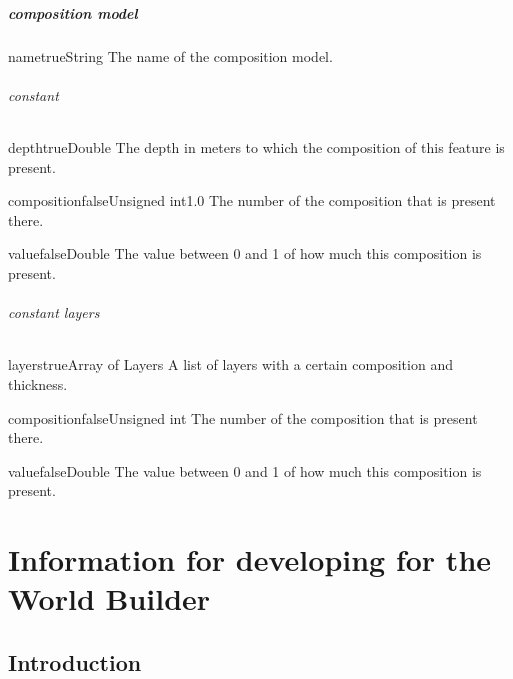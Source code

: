 \documentclass{book}
\begin{document}
\subsubsection{composition model}
\begin{parameterbox}{name}{true}{String}{}
The name of the composition model.
\end{parameterbox}

\paragraph{constant}
\begin{parameterbox}{depth}{true}{Double}{}
The depth in meters to which the composition of this feature is present.
\end{parameterbox}

\begin{parameterbox}{composition}{false}{Unsigned int}{1.0}
The number of the composition that is present there.
\end{parameterbox}

\begin{parameterbox}{value}{false}{Double}{}
The value between 0 and 1 of how much this composition is present.
\end{parameterbox}

\paragraph{constant layers}
\begin{parameterbox}{layers}{true}{Array of Layers}{}
A list of layers with a certain composition and thickness.
\end{parameterbox}

\begin{parameterbox}{composition}{false}{Unsigned int}{}
The number of the composition that is present there.
\end{parameterbox}

\begin{parameterbox}{value}{false}{Double}{}
The value between 0 and 1 of how much this composition is present.
\end{parameterbox}

\part{Information for developing for the World Builder}
\chapter{Introduction}
\end{document}
